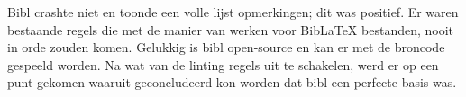 Bibl crashte niet en toonde een volle lijst opmerkingen; dit was positief. Er waren bestaande regels die met de manier van werken voor BibLaTeX bestanden, nooit in orde zouden komen. Gelukkig is bibl open-source en kan er met de broncode gespeeld worden. Na wat van de linting regels uit te schakelen, werd er op een punt gekomen waaruit geconcludeerd kon worden dat bibl een perfecte basis was.